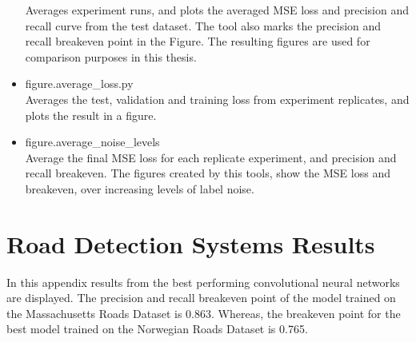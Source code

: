 \begin{itemize}
Averages experiment runs, and plots the averaged MSE loss and precision and recall curve from the test dataset. The tool also marks the precision and recall breakeven point in the Figure. The resulting figures are used for comparison purposes in this thesis.
\item figure.average\_loss.py\\
Averages the test, validation and training loss from experiment replicates, and plots the result in a figure. 
\item figure.average\_noise\_levels\\
Average the final MSE loss for each replicate experiment, and precision and recall breakeven. 
The figures created by this tools, show the MSE loss and breakeven, over increasing levels of label noise.
\end{itemize}

\section{Road Detection Systems Results}
\label{app:roaddetectionresults}
In this appendix results from the best performing convolutional neural networks are displayed. The precision and recall breakeven point of the model trained on the Massachusetts Roads Dataset is 0.863. Whereas, the breakeven point for the best model trained on the Norwegian Roads Dataset is 0.765.  \\

